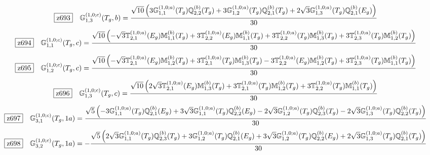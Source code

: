 \documentclass[fleqn,10pt,landscape]{jsarticle}
\begin{document}
\begin{dmath*}
\hspace*{3mm}\fbox{z693}\quad \mathbb{G}_{1,3}^{(1,0;c)}(T_{g},b)=\frac{\sqrt{10} \left(3 \mathbb{G}_{1,1}^{(1,0;a)}(T_{g}) \mathbb{Q}_{2,2}^{(b)}(T_{g}) + 3 \mathbb{G}_{1,2}^{(1,0;a)}(T_{g}) \mathbb{Q}_{2,1}^{(b)}(T_{g}) + 2 \sqrt{3} \mathbb{G}_{1,3}^{(1,0;a)}(T_{g}) \mathbb{Q}_{2,1}^{(b)}(E_{g})\right)}{30}
\end{dmath*}
\begin{dmath*}
\hspace*{3mm}\fbox{z694}\quad \mathbb{G}_{1,1}^{(1,0;c)}(T_{g},c)=\frac{\sqrt{10} \left(- \sqrt{3} \mathbb{T}_{2,1}^{(1,0;a)}(E_{g}) \mathbb{M}_{1,1}^{(b)}(T_{g}) + 3 \mathbb{T}_{2,2}^{(1,0;a)}(E_{g}) \mathbb{M}_{1,1}^{(b)}(T_{g}) + 3 \mathbb{T}_{2,2}^{(1,0;a)}(T_{g}) \mathbb{M}_{1,3}^{(b)}(T_{g}) + 3 \mathbb{T}_{2,3}^{(1,0;a)}(T_{g}) \mathbb{M}_{1,2}^{(b)}(T_{g})\right)}{30}
\end{dmath*}
\begin{dmath*}
\hspace*{3mm}\fbox{z695}\quad \mathbb{G}_{1,2}^{(1,0;c)}(T_{g},c)=\frac{\sqrt{10} \left(- \sqrt{3} \mathbb{T}_{2,1}^{(1,0;a)}(E_{g}) \mathbb{M}_{1,2}^{(b)}(T_{g}) + 3 \mathbb{T}_{2,1}^{(1,0;a)}(T_{g}) \mathbb{M}_{1,3}^{(b)}(T_{g}) - 3 \mathbb{T}_{2,2}^{(1,0;a)}(E_{g}) \mathbb{M}_{1,2}^{(b)}(T_{g}) + 3 \mathbb{T}_{2,3}^{(1,0;a)}(T_{g}) \mathbb{M}_{1,1}^{(b)}(T_{g})\right)}{30}
\end{dmath*}
\begin{dmath*}
\hspace*{3mm}\fbox{z696}\quad \mathbb{G}_{1,3}^{(1,0;c)}(T_{g},c)=\frac{\sqrt{10} \left(2 \sqrt{3} \mathbb{T}_{2,1}^{(1,0;a)}(E_{g}) \mathbb{M}_{1,3}^{(b)}(T_{g}) + 3 \mathbb{T}_{2,1}^{(1,0;a)}(T_{g}) \mathbb{M}_{1,2}^{(b)}(T_{g}) + 3 \mathbb{T}_{2,2}^{(1,0;a)}(T_{g}) \mathbb{M}_{1,1}^{(b)}(T_{g})\right)}{30}
\end{dmath*}
\begin{dmath*}
\hspace*{3mm}\fbox{z697}\quad \mathbb{G}_{3,1}^{(1,0;c)}(T_{g},1a)=\frac{\sqrt{5} \left(- 3 \mathbb{G}_{1,1}^{(1,0;a)}(T_{g}) \mathbb{Q}_{2,1}^{(b)}(E_{g}) + 3 \sqrt{3} \mathbb{G}_{1,1}^{(1,0;a)}(T_{g}) \mathbb{Q}_{2,2}^{(b)}(E_{g}) - 2 \sqrt{3} \mathbb{G}_{1,2}^{(1,0;a)}(T_{g}) \mathbb{Q}_{2,3}^{(b)}(T_{g}) - 2 \sqrt{3} \mathbb{G}_{1,3}^{(1,0;a)}(T_{g}) \mathbb{Q}_{2,2}^{(b)}(T_{g})\right)}{30}
\end{dmath*}
\begin{dmath*}
\hspace*{3mm}\fbox{z698}\quad \mathbb{G}_{3,2}^{(1,0;c)}(T_{g},1a)=- \frac{\sqrt{5} \left(2 \sqrt{3} \mathbb{G}_{1,1}^{(1,0;a)}(T_{g}) \mathbb{Q}_{2,3}^{(b)}(T_{g}) + 3 \mathbb{G}_{1,2}^{(1,0;a)}(T_{g}) \mathbb{Q}_{2,1}^{(b)}(E_{g}) + 3 \sqrt{3} \mathbb{G}_{1,2}^{(1,0;a)}(T_{g}) \mathbb{Q}_{2,2}^{(b)}(E_{g}) + 2 \sqrt{3} \mathbb{G}_{1,3}^{(1,0;a)}(T_{g}) \mathbb{Q}_{2,1}^{(b)}(T_{g})\right)}{30}
\end{dmath*}
\end{document}
